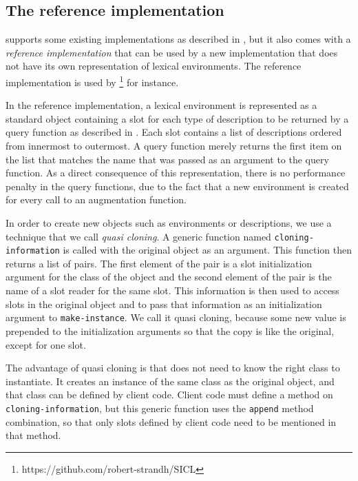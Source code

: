 \subsection{The reference implementation}

\trucler{} supports some existing \commonlisp{} implementations as
described in , but it also
comes with a \emph{reference implementation} that can be used by a new
\commonlisp{} implementation that does not have its own representation
of lexical environments.  The reference implementation is used by
\sicl{}%
\footnote{https://github.com/robert-strandh/SICL} for instance.

In the reference implementation, a lexical environment is represented
as a standard object containing a slot for each type of description to
be returned by a query function as described in
.  Each slot contains a list of
descriptions ordered from innermost to outermost.  A query function
merely returns the first item on the list that matches the name that
was passed as an argument to the query function.  As a direct
consequence of this representation, there is no performance penalty in
the query functions, due to the fact that a new environment is created
for every call to an augmentation function.

In order to create new objects such as environments or descriptions,
we use a technique that we call \emph{quasi cloning}.  A generic
function named \texttt{cloning-information} is called with the
original object as an argument.  This function then returns a list of
pairs.  The first element of the pair is a slot initialization argument
for the class of the object and the second element of the pair is the
name of a slot reader for the same slot.  This information is then
used to access slots in the original object and to pass that
information as an initialization argument to \texttt{make-instance}.
We call it quasi cloning, because some new value is prepended to the
initialization arguments so that the copy is like the original, except
for one slot.

The advantage of quasi cloning is that \trucler{} does not need to know
the right class to instantiate.  It creates an instance of the same
class as the original object, and that class can be defined by client
code.  Client code must define a method on
\texttt{cloning-information}, but this generic function uses the
\texttt{append} method combination, so that only slots defined by
client code need to be mentioned in that method.


